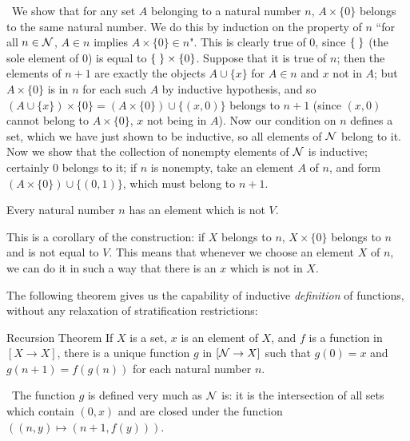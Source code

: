 \preuve\ We show that for any set $A$ belonging to a natural number $n$, $A
\times \{0\}$ belongs to the same natural number.  We do this by
induction on the property of $n$ ``for all $n \in
{\cal N}$, $A \in n$ implies $A \times \{0\} \in n$".  This is clearly true of
0, since $\mbox{$\{\;\}$}$ (the sole element of 0) is equal to $\mbox{$\{\;\}$} \times \{0\}$.
Suppose that it is true of $n$; then the elements of $n+1$ are exactly the
objects $A \cup \{x\}$ for $A \in n$ and $x$ not in $A$; but $A \times \{0\}$
is in $n$ for each such $A$ by inductive hypothesis, and so $(A \cup \{x\})
\times \{0\} = (A \times \{0\}) \cup \{(x,0)\}$ belongs to $n+1$ (since $(x,0)$
cannot belong to $A \times \{0\}$, $x$ not being in $A$).  Now our condition on
$n$ defines a set, which we have just shown to be inductive, so all elements of ${\cal N}$ belong to it.
Now we show that the collection of nonempty elements of ${\cal N}$ is
inductive; certainly 0 belongs to it; if $n$ is nonempty, take an
element $A$ of $n$, and form $(A \times \{0\}) \cup \{(0,1)\}$, which must
belong to $n+1$.
\finpreuve

\begin{cor}
 Every natural number $n$ has an element which is not
 $V$. 
\end{cor}

\preuve This is a corollary of the construction:  if $X$ belongs to $n$, $X
\times \{0\}$ belongs to $n$ and is not equal to $V$.  This means that whenever
we choose an element $X$ of $n$, we can do it in such a way that there is an
$x$ which is not in $X$.
\finpreuve

The following theorem gives us the capability of inductive
{\itshape definition\/} of functions, without any relaxation of
stratification restrictions:
\begin{Thm}{Recursion Theorem}
 If $X$ is a set, $x$ is an element of $X$, and $f$ is a
 function in $[X \rightarrow  X]$, there is a unique function $g$ in $[{\cal N}
 \rightarrow  X]$ such that $g(0) = x$ and $g(n+1) = f(g(n))$ for each
 natural number $n$.
\end{Thm}

\preuve\ The function $g$ is defined very much as ${\cal N}$
is:  it is the intersection of all sets which contain
$(0,x)$ and are closed under the function $((n,y) \mapsto  (n+1,f(y)))$.
\finpreuve

